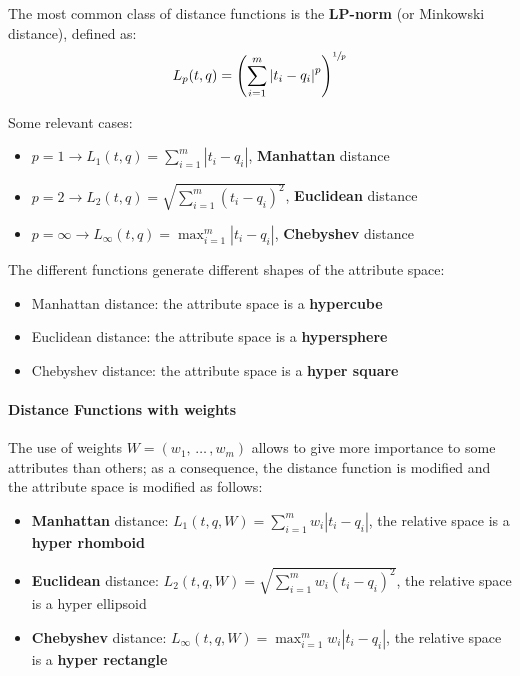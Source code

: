 \documentclass[english]{article}
\begin{document}
The most common class of distance functions is the \textbf{LP-norm} (or Minkowski distance), defined as:
\[ L_p(t, q) = \left( \displaystyle\sum_{i=1}^m \left| t_i - q_i \right|^p  \right)^{\sfrac{1}{p}} \]

Some relevant cases:

\begin{itemize}[itemsep=1ex]
  \item \(p = 1 \rightarrow L_1(t, q) = \displaystyle\sum_{i=1}^m \left| t_i - q_i \right|\), \textbf{Manhattan} distance
  \item \(p = 2 \rightarrow L_2(t, q) = \sqrt{\displaystyle\sum_{i=1}^m \left( t_i - q_i \right)^2}\), \textbf{Euclidean} distance
  \item \(p = \infty \rightarrow L_\infty(t, q) =\displaystyle \max_{i=1}^m \left| t_i - q_i \right|\), \textbf{Chebyshev} distance
\end{itemize}

The different functions generate different shapes of the attribute space:

\begin{itemize}
  \item Manhattan distance: the attribute space is a \textbf{hypercube}
  \item Euclidean distance: the attribute space is a \textbf{hypersphere}
  \item Chebyshev distance: the attribute space is a \textbf{hyper square}
\end{itemize}

\paragraph*{Distance Functions with weights}

The use of weights \(W = \left( w_1, \,\ldots\,, w_m \right)\) allows to give more importance to some attributes than others;
as a consequence, the distance function is modified and the attribute space is modified as follows:

\begin{itemize}[itemsep=1ex]
  \item \textbf{Manhattan} distance: \(L_1(t, q, W) = \displaystyle\sum_{i=1}^m w_i \left| t_i - q_i \right|\), the relative space is a \textbf{hyper rhomboid}
  \item \textbf{Euclidean} distance: \(L_2(t, q, W) = \sqrt{\displaystyle\sum_{i=1}^m w_i \left( t_i - q_i \right)^2}\), the relative space is a hyper ellipsoid
  \item \textbf{Chebyshev} distance: \(L_\infty(t, q, W) = \max_{i=1}^m w_i \left| t_i - q_i \right|\), the relative space is a \textbf{hyper rectangle}
\end{itemize}
\end{document}
